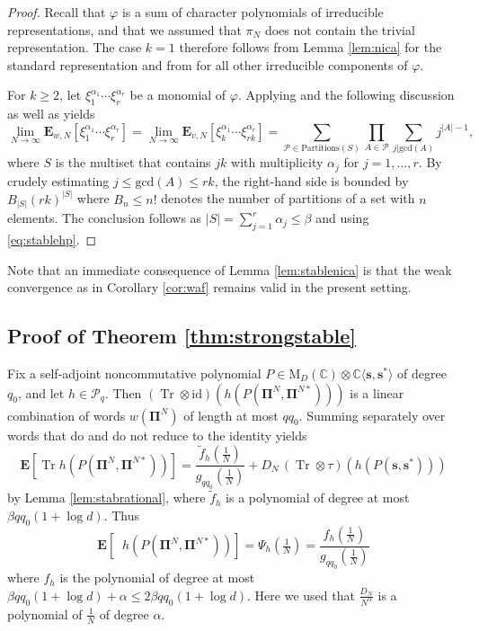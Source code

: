 \documentclass[10pt,reqno]{amsart}
\theoremstyle{definition}
\theoremstyle{remark}
\numberwithin{equation}{section}
\numberwithin{figure}{section}
\numberwithin{table}{section}
\newcommand{\tr}{\mathop{\mathrm{Tr}}}
\newcommand{\ntrNalp}{\mathop{\mathrm{tr}_{N^\alpha}}}
\begin{document}
\begin{proof}
Recall that $\varphi$ is a sum of character polynomials of irreducible 
representations, and that we assumed that $\pi_N$ does not contain the 
trivial representation. The case $k=1$ therefore follows from Lemma 
\ref{lem:nica} for the standard representation and from \cite[Corollary 
1.7]{HP23} for all other irreducible components of $\varphi$.

For $k\ge 2$, let $\xi_1^{\alpha_1}\cdots\xi_r^{\alpha_r}$ be a monomial 
of $\varphi$. Applying \cite[Theorem 1.3]{HP23} and the following 
discussion as well as \cite[Remark 7.3]{HP23} yields
$$
	\lim_{N\to\infty} 
	\mathbf{E}_{w,N}[\xi_1^{\alpha_1}\cdots\xi_r^{\alpha_r}] =
	\lim_{N\to\infty}
	\mathbf{E}_{v,N}[\xi_k^{\alpha_1}\cdots\xi_{rk}^{\alpha_r}]
	=
	\sum_{\mathcal{P}\in\mathrm{Partitions}(S)}
	\prod_{A\in\mathcal{P}}
	\sum_{j|\mathrm{gcd}(A)} j^{|A|-1},
$$
where $S$ is the multiset that contains $jk$ with 
multiplicity $\alpha_j$ for $j=1,\ldots,r$.
By crudely estimating $j\le \mathrm{gcd}(A)\le rk$, the right-hand side
is bounded by $B_{|S|}(rk)^{|S|}$ where $B_n\le n!$ denotes
the number of partitions of a set with $n$ elements. 
The conclusion follows as $|S|=\sum_{j=1}^r\alpha_j\le\beta$ and using 
\eqref{eq:stablehp}.
\end{proof}

Note that an immediate consequence of Lemma \ref{lem:stablenica} is that 
the weak convergence as in Corollary \ref{cor:waf} remains valid in the 
present setting.

\subsection{Proof of Theorem \ref{thm:strongstable}}

Fix a self-adjoint noncommutative polynomial $P\in 
\mathrm{M}_D(\mathbb{C}) \otimes 
\mathbb{C}\langle\boldsymbol{s},\boldsymbol{s}^*\rangle$ of degree $q_0$, 
and let $h\in\mathcal{P}_q$. Then 
$({\tr}\otimes\mathrm{id})(h(P(\boldsymbol{\Pi}^N,\boldsymbol{\Pi}^{N*})))$ 
is a linear combination of words $w(\boldsymbol{\Pi}^N)$ of length at most 
$qq_0$. Summing separately over words that do and do not reduce to the 
identity yields
$$
	\mathbf{E}[\tr h(P(\boldsymbol{\Pi}^N,\boldsymbol{\Pi}^{N*}))] =
	\frac{\tilde f_h(\frac{1}{N})}{g_{qq_0}(\frac{1}{N})} +
	D_N\, (\tr\otimes\tau)(h(P(\boldsymbol{s},\boldsymbol{s}^*)))
$$
by Lemma \ref{lem:stabrational},
where $\tilde f_h$ is a polynomial of degree at most $\beta qq_0(1+\log d)$.
Thus
$$
	\mathbf{E}[\ntrNalp h(P(\boldsymbol{\Pi}^N,\boldsymbol{\Pi}^{N*}))] 
	= \Psi_h(\tfrac{1}{N}) =
	\frac{f_h(\frac{1}{N})}{g_{qq_0}(\frac{1}{N})}
$$
where $f_h$ is the polynomial of degree at most $\beta qq_0(1+\log d)+\alpha
\le 2\beta qq_0(1+\log d)$.
Here we used that $\frac{D_N}{N^\alpha}$ is a polynomial of $\frac{1}{N}$ 
of degree $\alpha$. 
\end{document}
